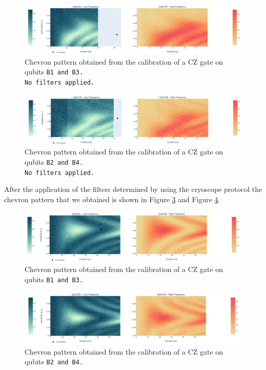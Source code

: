 \begin{figure}[h!]
    \centering
    \includegraphics[width=1.15\textwidth]{figures/png/Cryoscope/B1B3_nofilter.png}
    \caption{Chevron pattern obtained from the calibration of a CZ gate on qubits \tt{B1} and \tt{B3}.\\ No filters applied.}
    \label{fig:B1B3_nofilter}
\end{figure}

\begin{figure}[h!]
    \centering
    \includegraphics[width=1.15\textwidth]{figures/png/Cryoscope/B2B4_nofilter.png}
    \caption{Chevron pattern obtained from the calibration of a CZ gate on qubits \tt{B2} and \tt{B4}.\\ No filters applied.}
    \label{fig:B2B4_nofilter}
\end{figure}

After the application of the filters determined by using the cryoscope protocol the chevron pattern that we obtained is shown in Figure \ref{fig:B1B3} and Figure \ref{fig:B2B4}.

\begin{figure}[h!]
    \centering
    \includegraphics[width=1.15\textwidth]{figures/png/Cryoscope/B1B3.png}
    \caption{Chevron pattern obtained from the calibration of a CZ gate on qubits \tt{B1} and \tt{B3}.}
    \label{fig:B1B3}
\end{figure}

\begin{figure}[h!]
    \centering
    \includegraphics[width=1.15\textwidth]{figures/png/Cryoscope/B2B4.png}
    \caption{Chevron pattern obtained from the calibration of a CZ gate on qubits \tt{B2} and \tt{B4}.}
    \label{fig:B2B4}
\end{figure}
